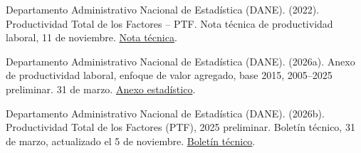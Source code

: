 \begin{thebibliography}{}
Departamento Administrativo Nacional de Estadística (DANE). (2022).
Productividad Total de los Factores -- PTF. Nota técnica de productividad laboral, 11 de noviembre.
\href{https://www.dane.gov.co/files/investigaciones/boletines/pib/productividad/metodologia_productividad_laboral.pdf}{Nota técnica}.

Departamento Administrativo Nacional de Estadística (DANE). (2026a).
Anexo de productividad laboral, enfoque de valor agregado, base 2015, 2005--2025 preliminar. 31 de marzo.
\href{https://www.dane.gov.co/files/operaciones/PTF/anex-PTF-ProductividadLaboral-2025.xlsx}{Anexo estadístico}.

Departamento Administrativo Nacional de Estadística (DANE). (2026b).
Productividad Total de los Factores (PTF), 2025 preliminar. Boletín técnico, 31 de marzo, actualizado el 5 de noviembre.
\href{https://www.dane.gov.co/files/operaciones/PTF/bol-PTF-2025.pdf}{Boletín técnico}.
\end{thebibliography}
